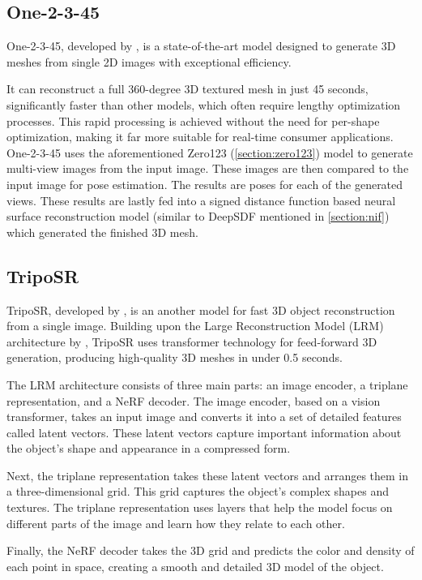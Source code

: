 \subsection{One-2-3-45}
One-2-3-45, developed by \textcite{liu_one-2-3-45_2023}, is a state-of-the-art model designed to generate 3D meshes from single 2D images with exceptional efficiency.

It can reconstruct a full 360-degree 3D textured mesh in just 45 seconds, significantly faster than other models, which often require lengthy optimization processes. This rapid processing is achieved without the need for per-shape optimization, making it far more suitable for real-time consumer applications.
One-2-3-45 uses the aforementioned Zero123 (\ref{section:zero123}) model to generate multi-view images from the input image. These images are then compared to the input image for pose estimation. The results are poses for each of the generated views.
These results are lastly fed into a signed distance function based neural surface reconstruction model (similar to DeepSDF mentioned in \ref{section:nif}) which generated the finished 3D mesh.


\subsection{TripoSR}
TripoSR, developed by \textcite{tochilkin_triposr_2024}, is an another model for fast 3D object reconstruction from a single image. Building upon the Large Reconstruction Model (LRM) architecture by \textcite{hong_lrm_2024}, TripoSR uses transformer technology for feed-forward 3D generation, producing high-quality 3D meshes in under 0.5 seconds.

The LRM architecture consists of three main parts: an image encoder, a triplane representation, and a NeRF decoder. The image encoder, based on a vision transformer, takes an input image and converts it into a set of detailed features called latent vectors. These latent vectors capture important information about the object's shape and appearance in a compressed form.

Next, the triplane representation takes these latent vectors and arranges them in a three-dimensional grid. This grid captures the object's complex shapes and textures. The triplane representation uses layers that help the model focus on different parts of the image and learn how they relate to each other.

Finally, the NeRF decoder takes the 3D grid and predicts the color and density of each point in space, creating a smooth and detailed 3D model of the object.

